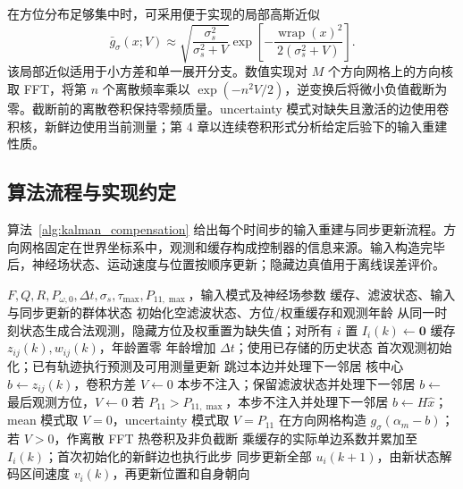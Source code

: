 \documentclass[UTF8,fontset=windows,11pt]{ctexart}
\begin{document}
在方位分布足够集中时，可采用便于实现的局部高斯近似
\begin{equation}
 \bar g_\sigma(x;V)\approx
 \sqrt{\frac{\sigma_s^2}{\sigma_s^2+V}}
 \exp\left[-\frac{\operatorname{wrap}(x)^2}{2(\sigma_s^2+V)}\right].
\end{equation}
该局部近似适用于小方差和单一展开分支。数值实现对 $M$ 个方向网格上的方向核取 FFT，将第 $n$ 个离散频率乘以 $\exp(-n^2V/2)$，逆变换后将微小负值截断为零。截断前的离散卷积保持零频质量。uncertainty 模式对缺失且激活的边使用卷积核，新鲜边使用当前测量；第 4 章以连续卷积形式分析给定后验下的输入重建性质。

\subsection{算法流程与实现约定}

算法~\ref{alg:kalman_compensation} 给出每个时间步的输入重建与同步更新流程。方向网格固定在世界坐标系中，观测和缓存构成控制器的信息来源。输入构造完毕后，神经场状态、运动速度与位置按顺序更新；隐藏边真值用于离线误差评价。

\begin{algorithm}[!tbp]
\caption{新鲜观测直通与缺失边预测输入}
\label{alg:kalman_compensation}
\small
\begin{algorithmic}[1]
\Require $F,Q,R,P_{\omega,0},\Delta t,\sigma_s,\tau_{\max},P_{11,\max}$，输入模式及神经场参数
\Ensure 缓存、滤波状态、输入与同步更新的群体状态
\State 初始化空滤波状态、方位/权重缓存和观测年龄
 \State 从同一时刻状态生成合法观测，隐藏方位及权重置为缺失值；对所有 $i$ 置 $I_i(k)\leftarrow\mathbf 0$
   \State 缓存 $z_{ij}(k),w_{ij}(k)$，年龄置零
  \Else
   \State 年龄增加 $\Delta t$；使用已存储的历史状态
  \EndIf
  \State 首次观测初始化；已有轨迹执行预测及可用测量更新
   \State 跳过本边并处理下一邻居
  \EndIf
   \State 核中心 $b\leftarrow z_{ij}(k)$，卷积方差 $V\leftarrow0$
   \State 本步不注入；保留滤波状态并处理下一邻居
   \State $b\leftarrow$ 最后观测方位，$V\leftarrow0$
  \Else
   \State 若 $P_{11}>P_{11,\max}$，本步不注入并处理下一邻居
   \State $b\leftarrow H\hat x$；mean 模式取 $V=0$，uncertainty 模式取 $V=P_{11}$
  \EndIf
  \State 在方向网格构造 $g_\sigma(\alpha_m-b)$；若 $V>0$，作离散 FFT 热卷积及非负截断
  \State 乘缓存的实际单边系数并累加至 $I_i(k)$；首次初始化的新鲜边也执行此步
 \EndFor
 \State 同步更新全部 $u_i(k+1)$，由新状态解码区间速度 $v_i(k)$，再更新位置和自身朝向
\EndFor
\end{algorithmic}
\end{algorithm}
\end{document}
